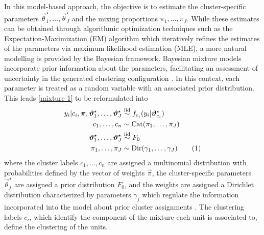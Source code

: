 \documentclass[12pt,	%
	a4paper,		%
	twoside,		%
	openright,		%
	titlepage,%
	]{book}
\newcommand\numberthis{\addtocounter{equation}{1}\tag{\theequation}}
\theoremstyle{definition}
\let\cite\citep
\begin{document}
In this model-based approach, the objective is to estimate the cluster-specific parameters $\vec{\theta}_1^\star, \ldots, \vec{\theta}_J^\star$ and the mixing proportions $\pi_1, \ldots, \pi_J$. While these estimates can be obtained through algorithmic optimization techniques such as the Expectation-Maximization (EM) algorithm \cite{EM-2} \cite{EM-1} which iteratively refines the estimates of the parameters via maximum likelihood estimation (MLE), a more natural modelling is provided by the Bayesian framework. Bayesian mixture models incorporate prior information about the parameters, facilitating an assessment of uncertainty in the generated clustering configuration \cite{paper-34}. In this context, each parameter is treated as a random variable with an associated prior distribution. This leads \eqref{mixture 1} to be reformulated into
\begin{align*}
    y_i|c_i,\vec{\pi},\vec{\theta}^\star_1, \ldots, \vec{\theta}^\star_J & \simiid f_{c_i}(y_i|\vec{\theta}_{c_i}^\star)\\
    c_1, \ldots, c_n & \sim \text{Cat}(\pi_1, \ldots, \pi_J)\\
    \vec{\theta}_1^\star,\ldots,\vec{\theta}_J^\star & \simiid F_0\\
    \pi_1,\ldots,\pi_J & \sim \text{Dir}(\gamma_1,\ldots,\gamma_J)
    \numberthis \label{mixture bayesian}
\end{align*}
where the cluster labels $c_1, \ldots, c_n$ are assigned a multinomial distribution with probabilities defined by the vector of weights $\vec{\pi}$, the cluster-specific parameters $\vec{\theta}_j^\star$ are assigned a prior distribution $F_0$, and the weights are assigned a Dirichlet distribution characterized by parameters $\gamma_j$ which regulate the information incorporated into the model about prior cluster assignments \cite{paper-33}. The clustering labels $c_i$, which identify the component of the mixture each unit is associated to, define the clustering of the units. 
\end{document}

